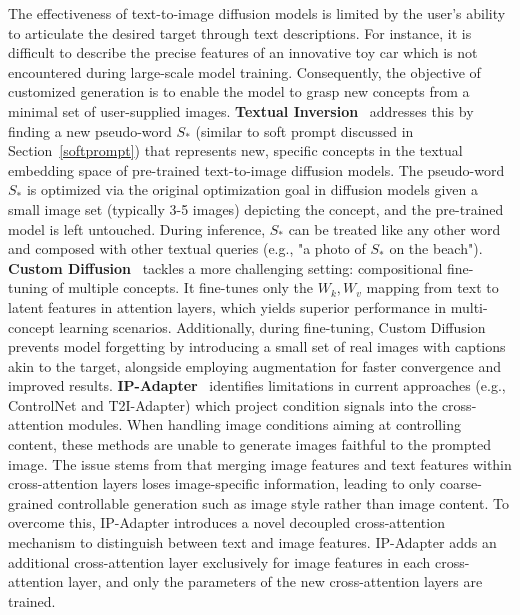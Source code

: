 The effectiveness of text-to-image diffusion models is limited by the user's ability to articulate the desired target through text descriptions. For instance, it is difficult to describe the precise features of an innovative toy car which is not encountered during large-scale model training. Consequently, the objective of customized generation is to enable the model to grasp new concepts from a minimal set of user-supplied images.
\textbf{Textual Inversion}~\cite{gal2022image} addresses this by finding a new pseudo-word $S_*$ (similar to soft prompt discussed in Section~\ref{softprompt}) that represents new, specific concepts in the textual embedding space of pre-trained text-to-image diffusion models. The pseudo-word $S_*$ is optimized via the original optimization goal in diffusion models given a small image set (typically 3-5 images) depicting the concept, and the pre-trained model is left untouched. During inference, $S_*$ can be treated like any other word and composed with other textual queries (e.g., "a photo of $S_*$ on the beach").
\textbf{Custom Diffusion}~\cite{kumari2023multi} tackles a more challenging setting: compositional fine-tuning of multiple concepts. It fine-tunes only the $W_k, W_v$ mapping from text to latent features in attention layers, which yields superior performance in multi-concept learning scenarios. Additionally, during fine-tuning, Custom Diffusion prevents model forgetting by introducing a small set of real images with captions akin to the target, alongside employing augmentation for faster convergence and improved results.
\textbf{IP-Adapter}~\cite{ye2023ip} identifies limitations in current approaches (e.g., ControlNet and T2I-Adapter) which project condition signals into the cross-attention modules. When handling image conditions aiming at controlling content, these methods are unable to generate images faithful to the prompted image. The issue stems from that merging image features and text features within cross-attention layers loses image-specific information, leading to only coarse-grained controllable generation such as image style rather than image content. To overcome this, IP-Adapter introduces a novel decoupled cross-attention mechanism to distinguish between text and image features. IP-Adapter adds an additional cross-attention layer exclusively for image features in each cross-attention layer, and only the parameters of the new cross-attention layers are trained.
